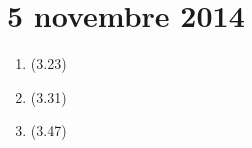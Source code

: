 \section{5 novembre 2014}

\begin{enumerate}
    \item (3.23)
    \item (3.31)
    \item (3.47)
\end{enumerate}